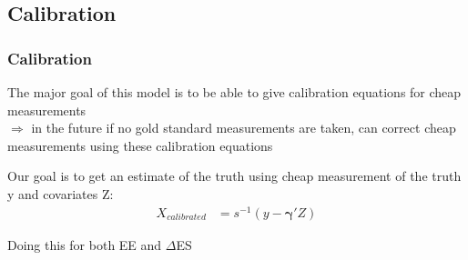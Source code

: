 \documentclass[handout]{beamer}\usepackage[]{graphicx}\usepackage[]{color}
\begin{document}
% 
% 

\subsection{Calibration}


\begin{frame}
\frametitle{Calibration}
The major goal of this model is to be able to give calibration equations for cheap measurements \\

$\Rightarrow$ in the future if no gold standard measurements are taken, can correct cheap measurements using these calibration equations \\

\vspace{0.2cm}

Our goal is to get an estimate of the truth using cheap measurement of the truth y and covariates Z:
\begin{align*}
  X_{calibrated} &= s^{-1}(y-\boldsymbol{\gamma}' Z) 
\end{align*}

\vspace{0.2cm}
Doing this for both EE and $\Delta$ES

\end{frame}


% 
% 
% 
% 
% 
% 
\end{document}
